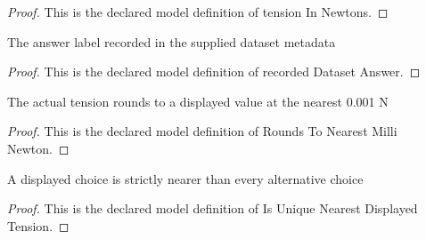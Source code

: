 \begin{proof}
  This is the declared model definition of tension In Newtons.
\end{proof}
\begin{definition}
  \label{def:physics:phyx-mini-0953:phyxminiproblems-problemphyxmini0953-recordeddatasetanswer}
  The answer label recorded in the supplied dataset metadata
\end{definition}
\begin{proof}
  This is the declared model definition of recorded Dataset Answer.
\end{proof}
\begin{definition}
  \label{def:physics:phyx-mini-0953:phyxminiproblems-problemphyxmini0953-roundstonearestmillinewton}
  The actual tension rounds to a displayed value at the nearest 0.001 N
\end{definition}
\begin{proof}
  This is the declared model definition of Rounds To Nearest Milli Newton.
\end{proof}
\begin{definition}
  \label{def:physics:phyx-mini-0953:phyxminiproblems-problemphyxmini0953-isuniquenearestdisplayedtension}
  A displayed choice is strictly nearer than every alternative choice
\end{definition}
\begin{proof}
  This is the declared model definition of Is Unique Nearest Displayed Tension.
\end{proof}
